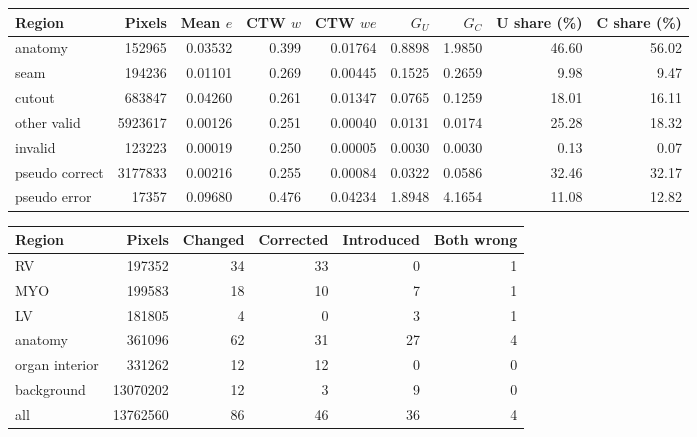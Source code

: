 \begin{tabular}{lrrrrrrrr}
\hline
Region & Pixels & Mean $e$ & CTW $w$ & CTW $we$ & $G_U$ & $G_C$ & U share (\%) & C share (\%) \\
\hline
anatomy & 152965 & 0.03532 & 0.399 & 0.01764 & 0.8898 & 1.9850 & 46.60 & 56.02 \\
seam & 194236 & 0.01101 & 0.269 & 0.00445 & 0.1525 & 0.2659 & 9.98 & 9.47 \\
cutout & 683847 & 0.04260 & 0.261 & 0.01347 & 0.0765 & 0.1259 & 18.01 & 16.11 \\
other valid & 5923617 & 0.00126 & 0.251 & 0.00040 & 0.0131 & 0.0174 & 25.28 & 18.32 \\
invalid & 123223 & 0.00019 & 0.250 & 0.00005 & 0.0030 & 0.0030 & 0.13 & 0.07 \\
pseudo correct & 3177833 & 0.00216 & 0.255 & 0.00084 & 0.0322 & 0.0586 & 32.46 & 32.17 \\
pseudo error & 17357 & 0.09680 & 0.476 & 0.04234 & 1.8948 & 4.1654 & 11.08 & 12.82 \\
\hline
\end{tabular}

\begin{tabular}{lrrrrr}
\hline
Region & Pixels & Changed & Corrected & Introduced & Both wrong \\
\hline
RV & 197352 & 34 & 33 & 0 & 1 \\
MYO & 199583 & 18 & 10 & 7 & 1 \\
LV & 181805 & 4 & 0 & 3 & 1 \\
anatomy & 361096 & 62 & 31 & 27 & 4 \\
organ interior & 331262 & 12 & 12 & 0 & 0 \\
background & 13070202 & 12 & 3 & 9 & 0 \\
all & 13762560 & 86 & 46 & 36 & 4 \\
\hline
\end{tabular}
